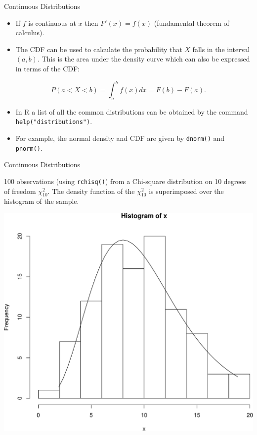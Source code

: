 \documentclass[9pt,ignorenonframetext,]{beamer}
\providecommand{\tightlist}{%
\setlength{\itemsep}{0pt}\setlength{\parskip}{0pt}}
\begin{document}
\begin{frame}[fragile]{Continuous Distributions}

\begin{itemize}
\tightlist
\item
  If \(f\) is continuous at \(x\) then \(F'(x)=f(x)\) (fundamental
  theorem of calculus).\\
\item
  The CDF can be used to calculate the probability that \(X\) falls in
  the interval \((a,b)\). This is the area under the density curve which
  can also be expressed in terms of the CDF:
\end{itemize}

\[P\left(a < X < b\right)=\int_{a}^{b}f(x)dx=F(b)-F(a).\]

\begin{itemize}
\tightlist
\item
  In R a list of all the common distributions can be obtained by the
  command \texttt{help("distributions")}.
\item
  For example, the normal density and CDF are given by \texttt{dnorm()}
  and \texttt{pnorm()}.
\end{itemize}

\end{frame}

\begin{frame}[fragile]{Continuous Distributions}

100 observations (using \texttt{rchisq()}) from a Chi-square
distribution on 10 degrees of freedom \(\chi^2_{10}\). The density
function of the \(\chi^2_{10}\) is superimposed over the histogram of
the sample.

\includegraphics{class2-jan11_files/figure-beamer/unnamed-chunk-4-1.pdf}

\end{frame}
\end{document}
